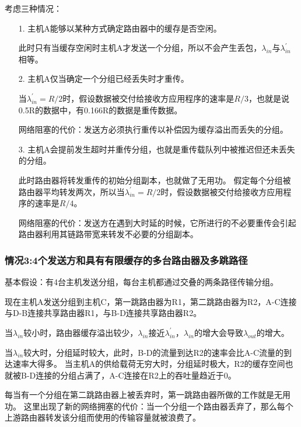 \documentclass[a4paper,left=2.5cm,right=2.5cm,11pt]{article}
\begin{document}
	考虑三种情况：
	\begin{itemize}
		\item[1.] 主机A能够以某种方式确定路由器中的缓存是否空闲。\par
				  此时只有当缓存空闲时主机A才发送一个分组，所以不会产生丢包，$\lambda_{in}$与$\lambda^{'}_{in}$相等。

		\item[2.] 主机A仅当确定一个分组已经丢失时才重传。\par
				  当$\lambda^{'}_{in}=R/2$时，假设数据被交付给接收方应用程序的速率是$R/3$，也就是说0.5R的数据中，有0.166R的数据是重传数据。\par

				  网络阻塞的代价：发送方必须执行重传以补偿因为缓存溢出而丢失的分组。

		\item[3.] 主机A会提前发生超时并重传分组，也就是重传载队列中被推迟但还未丢失的分组。\par
		          此时路由器将转发重传的初始分组副本，也就做了无用功。
				  假定每个分组被路由器平均转发两次，所以当$\lambda^{'}_{in}=R/2$时，假设数据被交付给接收方应用程序的速率是$R/4$。\par

				  网络阻塞的代价：发送方在遇到大时延的时候，它所进行的不必要重传会引起路由器利用其链路带宽来转发不必要的分组副本。
	\end{itemize}

\subsubsection{情况3:4个发送方和具有有限缓存的多台路由器及多跳路径}
	基本假设：有4台主机发送分组，每台主机都通过交叠的两条路径传输分组。\par

	现在主机A发送分组到主机C，第一跳路由器为R1，第二跳路由器为R2，A-C连接与D-B连接共享路由器R1，与B-D连接共享路由器R2。\par

	当$\lambda_{in}$较小时，路由器缓存溢出较少，$\lambda_{in}$接近$\lambda^{'}_{in}$，$\lambda_{in}$的增大会导致$\lambda_{out}$的增大。\par

	当$\lambda_{in}$较大时，分组延时较大，此时，B-D的流量到达R2的速率会比A-C流量的到达速率大得多。
	当主机A的供给载荷无穷大时，分组延时极大，R2的缓存空间也就被B-D连接的分组占满了，A-C连接在R2上的吞吐量趋近于0。\par

	每当有一个分组在第二跳路由器上被丢弃时，第一跳路由器所做的工作就是无用功。
	这里出现了新的网络拥塞的代价：当一个分组一个路由器丢弃了，那么每个上游路由器转发该分组而使用的传输容量就被浪费了。
\end{document}

